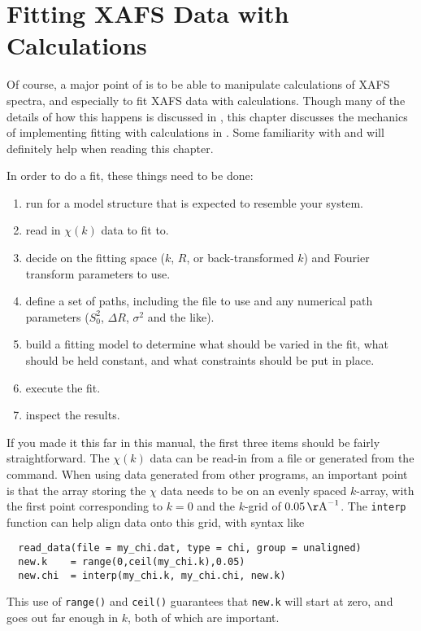 \section{Fitting XAFS Data with {\feff} Calculations} \label{Ch:FEFFIT}

Of course, a major point of {\ifeffit} is to be able to manipulate {\feff}
calculations of XAFS spectra, and especially to fit XAFS data with {\feff}
calculations.  Though many of the details of how this happens is discussed
in {\XAIBook}, this chapter discusses the mechanics of implementing fitting
with {\feff} calculations in {\ifeffit}.  Some familiarity with {\feff} and
{\feffit} will definitely help when reading this chapter.

In order to do a {\feff} fit, these things need to be done:
\begin{enumerate}
\item run {\feff} for a model structure that is expected to resemble your
  system.
\item read in $\chi(k)$ data to fit to.
\item decide on the fitting space ($k$, $R$, or back-transformed $k$) and
  Fourier transform parameters to use.
\item define a set of paths, including the {\feff} file to use and any
  numerical path parameters ($S_0^2$, $\Delta R$, $\sigma^2$ and the like).
\item build a fitting model to determine what should be varied in the fit,
  what should be held constant, and what constraints should be put in
  place.
\item execute the fit.
\item inspect the results.
\end{enumerate}
\noindent

If you made it this far in this manual, the first three items should be
fairly straightforward.  The $\chi(k)$ data can be read-in from a file or
generated from the {} command.  When using data generated from
other programs, an important point is that the {\ifeffit} array storing the
$\chi$ data needs to be on an evenly spaced $k$-array, with the first point
corresponding to $k=0$ and the $k$-grid of $\rm 0.05\,{\AA}^{-1}$.  The
{\tt{interp}} function can help align data onto this grid, with syntax like
\begin{verbatim}
  read_data(file = my_chi.dat, type = chi, group = unaligned)
  new.k    = range(0,ceil(my_chi.k),0.05)
  new.chi  = interp(my_chi.k, my_chi.chi, new.k)
\end{verbatim}
\noindent
This use of {\tt{range()}} and {\tt{ceil()}} guarantees that
{\tt{new.k}} will start at zero, and goes out far enough in $k$, both
of which are important.

